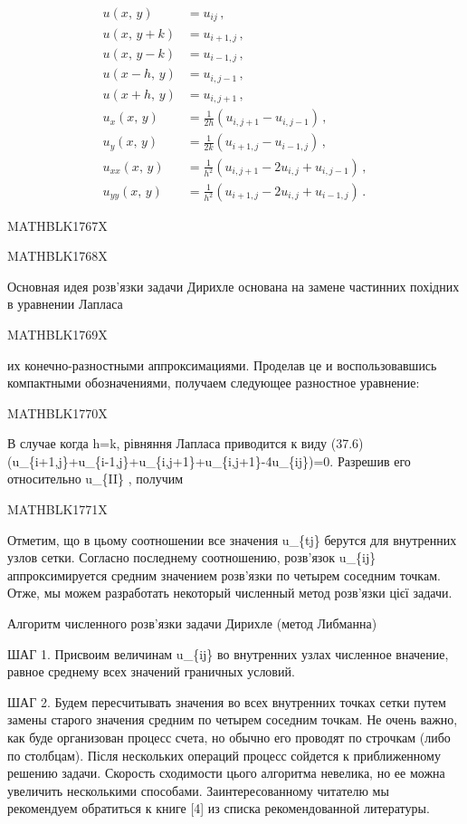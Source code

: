 \documentclass[
  ukrainian,
]{article}
\begin{document}
\[
\begin{split} u\left(x,\,y\right) &= u_{ij}\,,\\ u\left(x,\,y+k\right) &= u_{i+1,j}\,,\\ u\left(x,\,y-k\right) &= u_{i-1,j}\,,\\ u\left(x-h,\,y\right) &= u_{i,j-1}\,,\\ u\left(x+h,\,y\right) &= u_{i,j+1}\,,\\ u_{x}\left(x,\,y\right) &= \frac{1}{2h}\left(u_{i,j+1}-u_{i,j-1}\right)\,,\\ u_{y}\left(x,\,y\right) &= \frac{1}{2k}\left(u_{i+1,j}-u_{i-1,j}\right)\,,\\ u_{xx}\left(x,\,y\right) &= \frac{1}{h^{2}}\left(u_{i,j+1}-2u_{i,j}+u_{i,j-1}\right)\,,\\ u_{yy}\left(x,\,y\right) &= \frac{1}{h^{2}}\left(u_{i+1,j}-2u_{i,j}+u_{i-1,j}\right)\,. \end{split}
\]

MATHBLK1767X

MATHBLK1768X

Основная идея розв'язки задачи Дирихле основана на замене частинних
похідних в уравнении Лапласа

MATHBLK1769X

их конечно-разностными аппроксимациями. Проделав це и воспользовавшись
компактными обозначениями, получаем следующее разностное уравнение:

MATHBLK1770X

В случае когда h=k, рівняння Лапласа приводится к виду (37.6)
(u\_\{i+1,j\}+u\_\{i-1,j\}+u\_\{i,j+1\}+u\_\{i,j+1\}-4u\_\{ij\})=0.
Разрешив его относительно u\_\{II\} , получим

MATHBLK1771X

Отметим, що в цьому соотношении все значения u\_\{tj\} берутся для
внутренних узлов сетки. Согласно последнему соотношению, розв'язок
u\_\{ij\} аппроксимируется средним значением розв'язки по четырем
соседним точкам. Отже, мы можем разработать некоторый численный метод
розв'язки цієї задачи.

Алгоритм численного розв'язки задачи Дирихле (метод Либманна)

ШАГ 1. Присвоим величинам u\_\{ij\} во внутренних узлах численное
вначение, равное среднему всех значений граничных условий.

ШАГ 2. Будем пересчитывать значения во всех внутренних точках сетки
путем замены старого значения средним по четырем соседним точкам. Не
очень важно, как буде организован процесс счета, но обычно его проводят
по строчкам (либо по столбцам). Після нескольких операций процесс
сойдется к приближенному решению задачи. Скорость сходимости цього
алгоритма невелика, но ее можна увеличить несколькими способами.
Заинтересованному читателю мы рекомендуем обратиться к книге {[}4{]} из
списка рекомендованной литературы.
\end{document}
